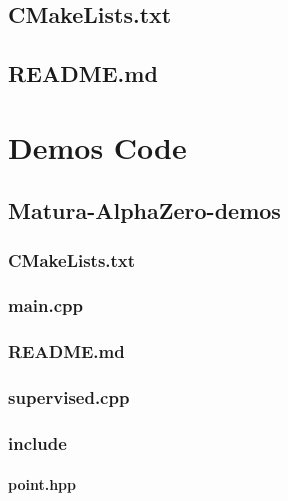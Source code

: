 \documentclass[12pt]{article}
\newcommand{\incFile}[2]{\label{code:#2}\newpage}
\newcommand{\incDemo}[2]{\label{demo:#2}\newpage}
\begin{document}
\subsection{CMakeLists.txt}											\incFile{python}{CMakeLists.txt}
\subsection{README.md}												\incFile{python}{README.md}

\section{Demos Code}
\subsection{Matura-AlphaZero-demos}
\subsubsection{CMakeLists.txt}										\incDemo{python}{CMakeLists.txt}
\subsubsection{main.cpp}												\incDemo{c++}{main.cpp}
\subsubsection{README.md}										\incDemo{python}{README.md}
\subsubsection{supervised.cpp}									\incDemo{c++}{supervised.cpp}
\subsubsection{include}													%
\paragraph{point.hpp}													\incDemo{c++}{include/point.hpp}
\end{document}
